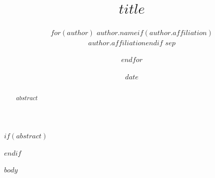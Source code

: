 \documentclass[11pt,a4paper]{article}
\title{$title$}
\author{%
$for(author)$
  $author.name$$if(author.affiliation)$\\$author.affiliation$$endif$%
  $sep$\and
$endfor$
}
\date{$date$}
\begin{document}
\maketitle

$if(abstract)$
\begin{abstract}
$abstract$
\end{abstract}
$endif$

$body$
\end{document}
